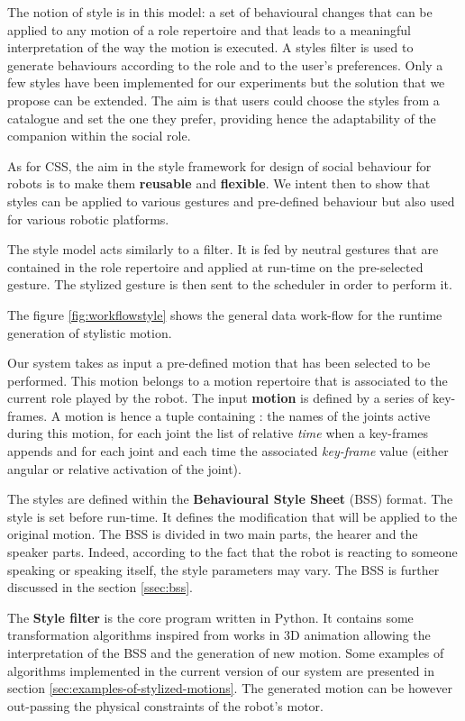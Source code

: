 \documentclass[smallextended]{svjour3}
\begin{document}
The notion of style is in this model: a set of behavioural changes that can be applied to any motion of a role repertoire and that leads to a meaningful interpretation of the way the motion is executed. 
A styles filter is used to generate behaviours according to the role and to the user's preferences. 
Only a few styles have been implemented for our experiments but the solution that we propose can be extended.
The aim is that users could choose the styles from a catalogue and set the one they prefer, providing hence the adaptability of the companion within the social role. 

As for CSS, the aim in the style framework for design of social behaviour for robots is to make them \textbf{reusable }and \textbf{flexible}.
We intent then to show that styles can be applied to various gestures and pre-defined behaviour but also used for various robotic platforms. 

The style model acts similarly to a filter. 
It is fed by neutral gestures that are contained in the role repertoire and applied at run-time on the pre-selected gesture. 
The stylized gesture is then sent to the scheduler in order to perform it.

The figure \ref{fig:workflowstyle} shows the general data work-flow for the runtime generation of stylistic motion.

Our system takes as input a pre-defined motion that has been selected to be performed. 
This motion belongs to a motion repertoire that is associated to the current role played by the robot.
The input \textbf{motion} is defined by a series of key-frames.
A motion is hence a tuple containing : 
the names of the joints active during this motion,
for each joint the list of relative \textit{time} when a key-frames appends and
for each joint and each time the associated \textit{key-frame} value (either angular or relative activation of the joint).

The styles are defined within the \textbf{Behavioural Style Sheet} (BSS) format. 
The style is set before run-time. 
It defines the modification that will be applied to the original motion.
The BSS is divided in two main parts, the hearer and the speaker parts.
Indeed,  according to the fact that the robot is reacting to someone speaking or speaking itself, the style parameters may vary.
The BSS is further discussed in the section \ref{ssec:bss}.

The \textbf{Style filter} is the core program written in Python. 
It contains some transformation algorithms inspired from works in 3D animation allowing the interpretation of the BSS and the generation of new motion.
Some examples of algorithms implemented in the current version of our system are presented in section \ref{sec:examples-of-stylized-motions}.
The generated motion can be however out-passing the physical constraints of the robot's motor. 
\end{document}
